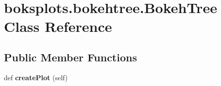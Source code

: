 \hypertarget{classboksplots_1_1bokehtree_1_1BokehTree}{}\section{boksplots.\+bokehtree.\+Bokeh\+Tree Class Reference}
\label{classboksplots_1_1bokehtree_1_1BokehTree}
\subsection*{Public Member Functions}
\begin{DoxyCompactItemize}
\item 
\mbox{\label{classboksplots_1_1bokehtree_1_1BokehTree_abb57a428cd6d7a107b4171f918d9435e}} 
def {\bfseries create\+Plot} (self)
\end{DoxyCompactItemize}
